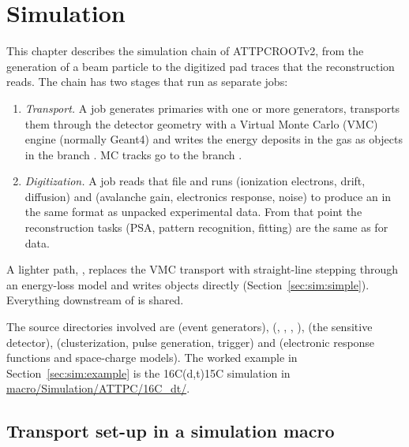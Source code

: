 \chapter{Simulation}
\label{ch:simulation}

This chapter describes the simulation chain of ATTPCROOTv2, from the generation of a beam
particle to the digitized pad traces that the reconstruction reads. The chain has two stages that
run as separate jobs:

\begin{enumerate}
  \item \emph{Transport.} A  job generates primaries with one or more generators,
    transports them through the detector geometry with a Virtual Monte Carlo (VMC) engine
    (normally Geant4) and writes the energy deposits in the gas as  objects in the
    branch . MC tracks go to the branch .
  \item \emph{Digitization.} A  job reads that file and runs
     (ionization electrons, drift, diffusion) and 
    (avalanche gain, electronics response, noise) to produce an  in the same
    format as unpacked experimental data. From that point the reconstruction tasks (PSA, pattern
    recognition, fitting) are the same as for data.
\end{enumerate}

A lighter path, , replaces the VMC transport with straight-line stepping
through an energy-loss model and writes  objects directly
(Section~\ref{sec:sim:simple}). Everything downstream of  is shared.

The source directories involved are  (event generators),
 (, , ,
),  (the sensitive detector),
 (clusterization, pulse generation, trigger) and  (electronic
response functions and space-charge models). The worked example in
Section~\ref{sec:sim:example} is the 16C(d,t)15C simulation in
\url{macro/Simulation/ATTPC/16C_dt/}.

\section{Transport set-up in a simulation macro}
\label{sec:sim:transport}

